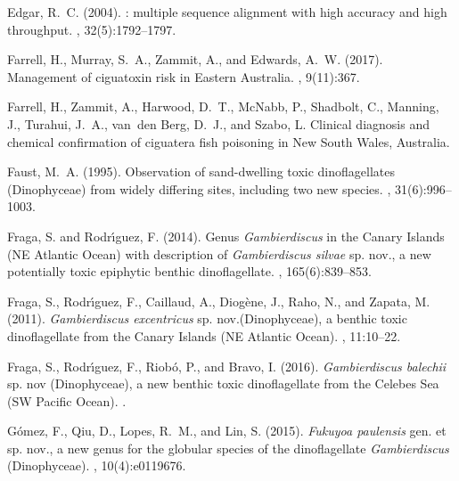 \documentclass[10pt,letterpaper]{article}
\begin{document}
\begin{thebibliography}{10}
Edgar, R.~C. (2004).
: multiple sequence alignment with high accuracy and high
  throughput.
, 32(5):1792--1797.

Farrell, H., Murray, S.~A., Zammit, A., and Edwards, A.~W. (2017).
\newblock Management of ciguatoxin risk in {E}astern {A}ustralia.
, 9(11):367.

Farrell, H., Zammit, A., Harwood, D.~T., McNabb, P., Shadbolt, C., Manning, J.,
  Turahui, J.~A., van~den Berg, D.~J., and Szabo, L.
\newblock Clinical diagnosis and chemical confirmation of ciguatera fish
  poisoning in {N}ew {S}outh {W}ales, {A}ustralia.

Faust, M.~A. (1995).
\newblock Observation of sand-dwelling toxic dinoflagellates ({D}inophyceae)
  from widely differing sites, including two new species.
, 31(6):996--1003.

Fraga, S. and Rodr{\'\i}guez, F. (2014).
\newblock Genus \emph{Gambierdiscus} in the {C}anary {I}slands ({NE} {A}tlantic
  {O}cean) with description of \emph{Gambierdiscus silvae} sp. nov., a new
  potentially toxic epiphytic benthic dinoflagellate.
, 165(6):839--853.

Fraga, S., Rodr{\'\i}guez, F., Caillaud, A., Diog{\`e}ne, J., Raho, N., and
  Zapata, M. (2011).
\newblock \emph{Gambierdiscus excentricus} sp. nov.({D}inophyceae), a benthic
  toxic dinoflagellate from the {C}anary {I}slands ({NE} {A}tlantic {O}cean).
, 11:10--22.

Fraga, S., Rodr{\'\i}guez, F., Riob{\'o}, P., and Bravo, I. (2016).
\newblock \emph{Gambierdiscus balechii} sp. nov ({D}inophyceae), a new benthic
  toxic dinoflagellate from the {C}elebes {S}ea ({SW} {P}acific {O}cean).
.

G{\'o}mez, F., Qiu, D., Lopes, R.~M., and Lin, S. (2015).
\newblock \emph{Fukuyoa paulensis} gen. et sp. nov., a new genus for the
  globular species of the dinoflagellate \emph{Gambierdiscus} ({D}inophyceae).
, 10(4):e0119676.


\end{thebibliography}
\end{document}

